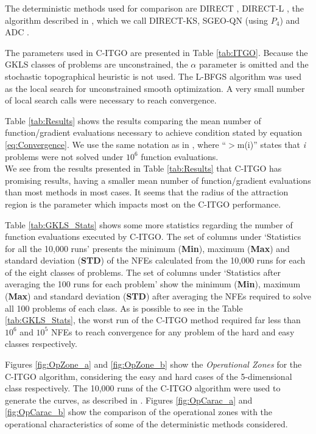 The deterministic methods used for comparison are DIRECT \citep{DIRECT}, DIRECT-L \citep{DIRECTL}, the algorithm described in \cite{ADC}, which we call DIRECT-KS, SGEO-QN \citep{SGEO} (using $P_4$) and ADC \citep{ADC2}. 

The parameters used in C-ITGO are presented in Table \ref{tab:ITGO}. Because the GKLS classes of problems are unconstrained, the $\alpha$ parameter is omitted and the stochastic topographical heuristic is not used. The L-BFGS algorithm was used as the local search for unconstrained smooth optimization. A very small number of local search calls were necessary to reach convergence.



Table \ref{tab:Results} shows the results comparing the mean number of function/gradient evaluations necessary to achieve condition stated by equation \ref{eq:Convergence}. We use the same notation as in \cite{NAT}, where “$>$m(i)” states that \textit{i} problems were not solved under $10^6$ function evaluations.\\




We see from the results presented in Table \ref{tab:Results} that C-ITGO has promising results, having a smaller mean number of function/gradient evaluations than most methods in most cases. It seems that the radius of the attraction region is the parameter which impacts most on the C-ITGO performance. 

Table \ref{tab:GKLS_Stats} shows some more statistics regarding the number of function evaluations executed by C-ITGO. The set of columns under `Statistics for all the 10,000 runs' presents the minimum (\textbf{Min}), maximum (\textbf{Max}) and standard deviation (\textbf{STD}) of the NFEs calculated from the 10,000 runs for each of the eight classes of problems. The set of columns under `Statistics after averaging the 100 runs for each problem' show the minimum (\textbf{Min}), maximum (\textbf{Max}) and standard deviation (\textbf{STD}) after averaging the NFEs required to solve all 100 problems of each class. As is possible to see in the Table \ref{tab:GKLS_Stats}, the worst run of the C-ITGO method required far less than $10^6$ and $10^5$ NFEs to reach convergence for any problem of the hard and easy classes respectively.



Figures \ref{fig:OpZone_a} and \ref{fig:OpZone_b} show the \textit{Operational Zones} for the C-ITGO algorithm, considering the easy and hard cases of the 5-dimensional class respectively. The 10,000 runs of the C-ITGO algorithm were used to generate the curves, as described in \cite{NAT}. Figures \ref{fig:OpCarac_a} and \ref{fig:OpCarac_b} show the comparison of the operational zones with the operational characteristics of some of the deterministic methods considered.



